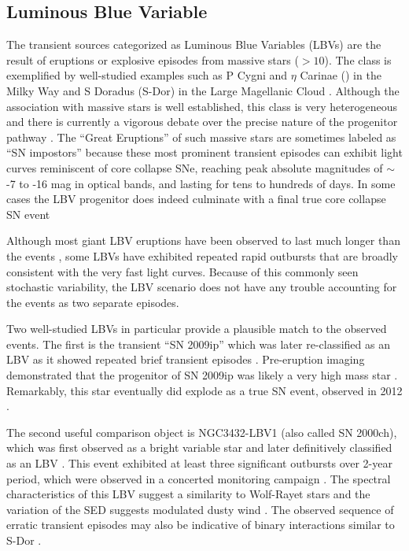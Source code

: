 \subsection{Luminous Blue Variable}

The transient sources categorized as Luminous Blue Variables (LBVs)
are the result of eruptions or explosive episodes from massive stars
($>10$\Msun).  The class is exemplified by well-studied examples such
as P Cygni and $\eta$ Carinae (\etacar) in the Milky Way and S Doradus
(S-Dor) in the Large Magellanic Cloud \citep[for recent overviews of
  the LBV class, see][]{Smith:2011b, Kochanek:2012}.  Although the
association with massive stars is well established, this class is very
heterogeneous and there is currently a vigorous debate over the
precise nature of the progenitor pathway
\citep{Smith:2015,Humphreys:2016,Smith:2016}.  The ``Great Eruptions''
of such massive stars are sometimes labeled as ``SN impostors''
because these most prominent transient episodes can exhibit light
curves reminiscent of core collapse SNe, reaching peak absolute
magnitudes of $\sim$-7 to -16 mag in optical bands, and lasting for
tens to hundreds of days.  In some cases the LBV progenitor does
indeed culminate with a final true core collapse SN event
\citep[e.g.]{Mauerhan:2013, Tartaglia:2016}

Although most giant LBV eruptions have been observed to last much
longer than the \spock events \citep{Smith:2011b}, some LBVs have
exhibited repeated rapid outbursts that are broadly consistent with
the very fast \spock light curves. Because of this commonly seen
stochastic variability, the LBV scenario does not have any trouble
accounting for the \spock events as two separate episodes.

Two well-studied LBVs in particular provide a plausible match to the
observed \spock events.  The first is the transient ``SN 2009ip''
\citep{Maza:2009} which was later re-classified as an LBV as it showed
repeated brief transient episodes \citep[e.g.,][]{Miller:2009,
  Li:2009, Berger:2009, Drake:2010}. Pre-eruption \HST imaging
demonstrated that the progenitor of SN 2009ip was likely a very high
mass star \citep[$\gtrsim50$ \Msun,][]{Smith:2010, Foley:2011}.
Remarkably, this star eventually did explode as a true SN event,
observed in 2012 \citep{Mauerhan:2013, Pastorello:2013, Prieto:2013}.

The second useful comparison object is NGC3432-LBV1 (also called SN
2000ch), which was first observed as a bright variable star
\citep{Papenkova:2000} and later definitively classified as an LBV
\citep{Wagner:2004}.  This event exhibited at least three significant
outbursts over 2-year period, which were observed in a concerted
monitoring campaign \citep{Pastorello:2010}.  The spectral
characteristics of this LBV suggest a similarity to Wolf-Rayet stars
\citep{Pastorello:2010} and the variation of the SED suggests
modulated dusty wind \citep{Wagner:2004, Kochanek:2012}. The observed
sequence of erratic transient episodes may also be indicative of
binary interactions similar to S-Dor \citep{Pastorello:2010,
  Smith:2011b}.



